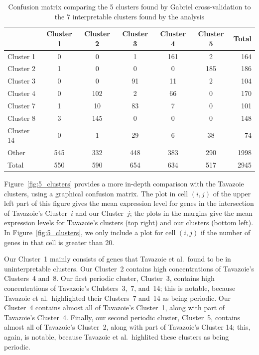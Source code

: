 \documentclass[12pt]{article}
\begin{document}
\begin{table}
\caption{\label{table:confusion} Confusion matrix comparing
    the 5 clusters found by Gabriel cross-validation to the 7 interpretable
    clusters found by the \cite{tavazoie1999systematic} analysis}
\centering
\begin{tabular}{lcccccr}
  \toprule
 & Cluster 1 & Cluster 2 & Cluster 3 & Cluster 4 & Cluster 5 & Total \\ 
  \midrule
Cluster 1 & 0 & 0 & 1 & 161 & 2 & 164 \\ 
  Cluster 2 & 1 & 0 & 0 & 0 & 185 & 186 \\ 
  Cluster 3 & 0 & 0 & 91 & 11 & 2 & 104 \\ 
  Cluster 4 & 0 & 102 & 2 & 66 & 0 & 170 \\ 
  Cluster 7 & 1 & 10 & 83 & 7 & 0 & 101 \\ 
  Cluster 8 & 3 & 145 & 0 & 0 & 0 & 148 \\ 
  Cluster 14 & 0 & 1 & 29 & 6 & 38 & 74 \\ 
  Other & 545 & 332 & 448 & 383 & 290 & 1998 \\ 
  \midrule
  Total & 550 & 590 & 654 & 634 & 517 & 2945 \\ 
   \bottomrule
\end{tabular}
\end{table}


Figure~\ref{fig:5_clusters} provides a more in-depth comparison with the
Tavazoie clusters, using a graphical confusion matrix.  The plot in cell
$(i,j)$ of the upper left part of this figure gives the mean expression level
for genes in the intersection of Tavazoie's Cluster~$i$ and our Cluster~$j$;
the plots in the margins give the mean expression levels for Tavazoie's
clusters (top right) and our clusters (bottom left). In
Figure~\ref{fig:5_clusters}, we only include a plot for cell $(i,j)$ if the
number of genes in that cell is greater than $20$.


Our Cluster~1 mainly consists of genes that Tavazoie et al.\ found to be in
uninterpretable clusters. Our Cluster~2 contains high concentrations of
Tavazoie's Clusters~4 and~8. Our first periodic cluster, Cluster~3, contains
high concentrations of Tavazoie's Clulsters~3,~7, and~14; this is notable,
because Tavazoie et al.\ highlighted their Clusters~7 and~14 as being
periodic. Our Cluster~4 contains almost all of Tavazoie's Cluster~1, along
with part of Tavazoie's Cluster~4. Finally, our second periodic cluster,
Cluster~5, contains almost all of Tavazoie's Cluster~2, along with part of
Tavazoie's Cluster 14; this, again, is notable, because Tavazoie et al.\
highlited these clusters as being periodic.
\end{document}
